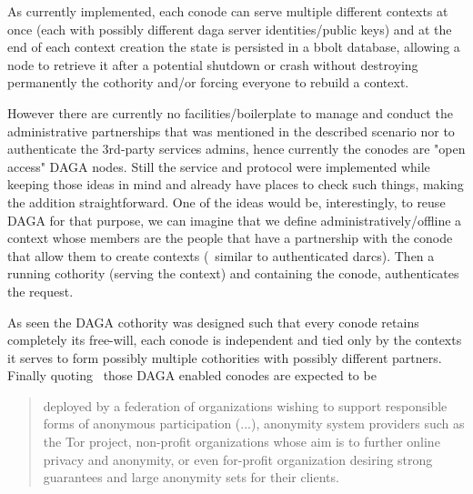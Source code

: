     As currently implemented, each conode can serve multiple different contexts at once
    (each with possibly different daga server identities/public keys)
    and at the end of each context creation the state is persisted in
    a bbolt database, allowing a node to retrieve it after a potential shutdown or crash without destroying permanently the cothority
    and/or forcing everyone to rebuild a context.

    However there are currently no facilities/boilerplate to manage and conduct the administrative partnerships that was mentioned in the
    described scenario nor to authenticate the 3rd-party services admins, hence currently the conodes are "open access" DAGA nodes.
    Still the service and protocol were implemented while keeping those ideas in mind and already have places to check such things,
    making the addition straightforward.
    One of the ideas would be, interestingly, to reuse DAGA for that purpose, we can imagine that we define administratively/offline a
    context whose members are the people that have a partnership with the conode that allow them to create contexts (~similar to authenticated darcs).
    Then a running cothority (serving the context) and containing the conode, authenticates the request.


    As seen the DAGA cothority was designed such that every conode retains completely its free-will,
    each conode is independent and tied only by the contexts it serves to form possibly multiple cothorities with possibly
    different partners.
    Finally quoting~\cite{syta_identity_2015} those DAGA enabled conodes are expected to be \blockquote{
        deployed by a federation of organizations wishing to support responsible forms of anonymous participation (...),
        anonymity system providers such as the Tor project, non-profit organizations whose aim is to further online privacy
        and anonymity, or even for-profit organization desiring strong guarantees and large anonymity sets for their clients.
    }

